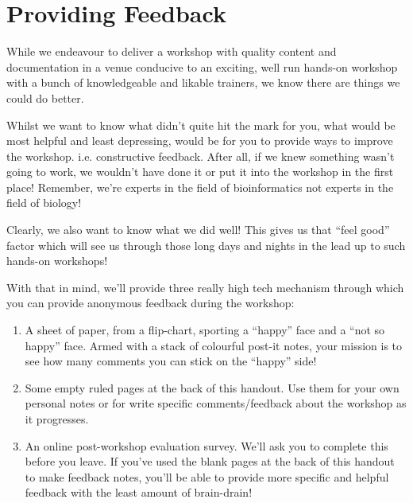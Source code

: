 %
%
\newpage


\section{Providing Feedback}
While we endeavour to deliver a workshop with quality content and documentation
in a venue conducive to an exciting, well run hands-on workshop with a bunch of
knowledgeable and likable trainers, we know there are things we could do better.

Whilst we want to know what didn't quite hit the mark for you, what would be
most helpful and least depressing, would be for you to provide ways to improve
the workshop. i.e. constructive feedback. After all, if we knew something wasn't
going to work, we wouldn't have done it or put it into the workshop in the first
place! Remember, we're experts in the field of bioinformatics not experts in the
field of biology!

Clearly, we also want to know what we did well! This gives us that ``feel good''
factor which will see us through those long days and nights in the lead up to
such hands-on workshops!

With that in mind, we'll provide three really high tech mechanism through which you
can provide anonymous feedback during the workshop:
\begin{enumerate}
  \item A sheet of paper, from a flip-chart, sporting a ``happy'' face and a
  ``not so happy'' face. Armed with a stack of colourful post-it notes, your
  mission is to see how many comments you can stick on the ``happy'' side!
  
  \item Some empty ruled pages at the back of this handout. Use them for your
  own personal notes or for write specific comments/feedback about the workshop
  as it progresses.
  
  \item An online post-workshop evaluation survey. We'll ask you to complete
  this before you leave. If you've used the blank pages at the back of this
  handout to make feedback notes, you'll be able to provide more specific and
  helpful feedback with the least amount of brain-drain!
\end{enumerate}

